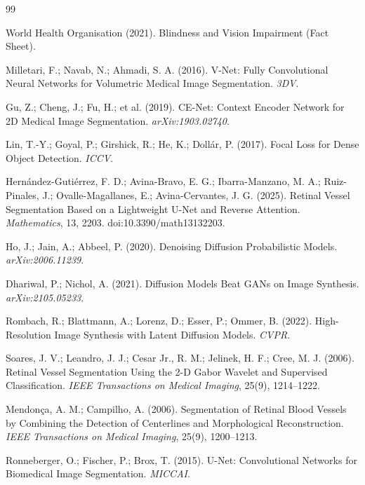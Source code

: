 \documentclass[journal,article,submit,pdftex,moreauthors]{Definitions/mdpi}
\begin{document}
\begin{thebibliography}{99}

World Health Organisation (2021).
Blindness and Vision Impairment (Fact Sheet).

Milletari, F.; Navab, N.; Ahmadi, S. A. (2016).
V-Net: Fully Convolutional Neural Networks for Volumetric Medical Image Segmentation.
\textit{3DV}.

Gu, Z.; Cheng, J.; Fu, H.; et al. (2019).
CE-Net: Context Encoder Network for 2D Medical Image Segmentation.
\textit{arXiv:1903.02740}.

Lin, T.-Y.; Goyal, P.; Girshick, R.; He, K.; Doll\'ar, P. (2017).
Focal Loss for Dense Object Detection.
\textit{ICCV}.


Hernández-Gutiérrez, F. D.; Avina-Bravo, E. G.; Ibarra-Manzano, M. A.;
Ruiz-Pinales, J.; Ovalle-Magallanes, E.; Avina-Cervantes, J. G. (2025).
Retinal Vessel Segmentation Based on a Lightweight U-Net and Reverse Attention.
\textit{Mathematics}, 13, 2203. doi:10.3390/math13132203.

Ho, J.; Jain, A.; Abbeel, P. (2020).
Denoising Diffusion Probabilistic Models.
\textit{arXiv:2006.11239}.

Dhariwal, P.; Nichol, A. (2021).
Diffusion Models Beat GANs on Image Synthesis.
\textit{arXiv:2105.05233}.

Rombach, R.; Blattmann, A.; Lorenz, D.; Esser, P.; Ommer, B. (2022).
High-Resolution Image Synthesis with Latent Diffusion Models.
\textit{CVPR}.

Soares, J. V.; Leandro, J. J.; Cesar Jr., R. M.; Jelinek, H. F.; Cree, M. J. (2006).
Retinal Vessel Segmentation Using the 2-D Gabor Wavelet and Supervised Classification.
\textit{IEEE Transactions on Medical Imaging}, 25(9), 1214--1222.

Mendon\c{c}a, A. M.; Campilho, A. (2006).
Segmentation of Retinal Blood Vessels by Combining the Detection of Centerlines and Morphological Reconstruction.
\textit{IEEE Transactions on Medical Imaging}, 25(9), 1200--1213.



Ronneberger, O.; Fischer, P.; Brox, T. (2015).
U-Net: Convolutional Networks for Biomedical Image Segmentation.
\textit{MICCAI}.


\end{thebibliography}
\end{document}
